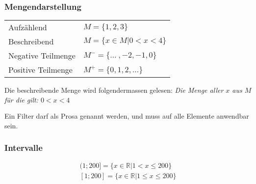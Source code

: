 \begin{multicols}{2}
\subsubsection{Mengendarstellung}
	\begin{tabular}{l l}
		Aufzählend & $M = \{1,2,3\}$ \\
		Beschreibend & $M = \{x \in M|0<x<4\}$ \\
		Negative Teilmenge & $M^-= \{\dots\ ,-2,-1,0\}$ \\
		Positive Teilmenge & $M^+= \{0,1,2,\dots\}$
	\end{tabular}
	
	Die beschreibende Menge wird folgendermassen gelesen:
	\emph{Die Menge aller $x$ aus $M$ für die gilt: $0<x<4$} 
	
	Ein Filter darf als Prosa genannt werden, und muss auf alle Elemente anwendbar sein.

\subsubsection{Intervalle}
	\begin{align*}
		(1;200] = \{x \in\mathbb{R}|1<x \leq 200\} \\
		[1;200] = \{x\in\mathbb{R}|1\leq x \leq 200\}
	\end{align*}

\end{multicols}

